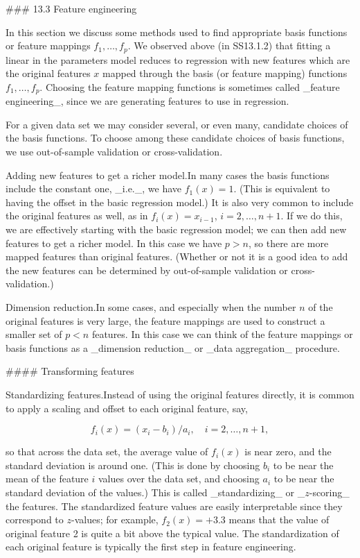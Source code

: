 

### 13.3 Feature engineering

In this section we discuss some methods used to find appropriate basis functions or feature mappings \(f_{1},\ldots,f_{p}\). We observed above (in SS13.1.2) that fitting a linear in the parameters model reduces to regression with new features which are the original features \(x\) mapped through the basis (or feature mapping) functions \(f_{1},\ldots,f_{p}\). Choosing the feature mapping functions is sometimes called _feature engineering_, since we are generating features to use in regression.

For a given data set we may consider several, or even many, candidate choices of the basis functions. To choose among these candidate choices of basis functions, we use out-of-sample validation or cross-validation.

Adding new features to get a richer model.In many cases the basis functions include the constant one, _i.e._, we have \(f_{1}(x)=1\). (This is equivalent to having the offset in the basic regression model.) It is also very common to include the original features as well, as in \(f_{i}(x)=x_{i-1}\), \(i=2,\ldots,n+1\). If we do this, we are effectively starting with the basic regression model; we can then add new features to get a richer model. In this case we have \(p>n\), so there are more mapped features than original features. (Whether or not it is a good idea to add the new features can be determined by out-of-sample validation or cross-validation.)

Dimension reduction.In some cases, and especially when the number \(n\) of the original features is very large, the feature mappings are used to construct a smaller set of \(p<n\) features. In this case we can think of the feature mappings or basis functions as a _dimension reduction_ or _data aggregation_ procedure.

#### Transforming features

Standardizing features.Instead of using the original features directly, it is common to apply a scaling and offset to each original feature, say,

\[f_{i}(x)=(x_{i}-b_{i})/a_{i},\quad i=2,\ldots,n+1,\]

so that across the data set, the average value of \(f_{i}(x)\) is near zero, and the standard deviation is around one. (This is done by choosing \(b_{i}\) to be near the mean of the feature \(i\) values over the data set, and choosing \(a_{i}\) to be near the standard deviation of the values.) This is called _standardizing_ or _\(z\)-scoring_ the features. The standardized feature values are easily interpretable since they correspond to \(z\)-values; for example, \(f_{2}(x)=+3.3\) means that the value of original feature 2 is quite a bit above the typical value. The standardization of each original feature is typically the first step in feature engineering.

